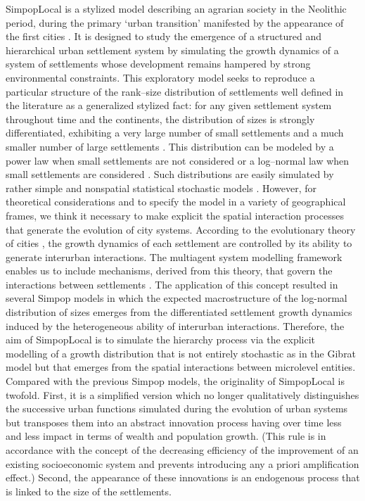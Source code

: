 SimpopLocal is a stylized model describing an agrarian society in the Neolithic period, during the primary ‘urban transition’ manifested by the appearance of the first cities \autocite{Schmitt2014}. It is designed to study the emergence of a structured and hierarchical urban settlement system by simulating the growth dynamics of a system of settlements whose development remains hampered by strong environmental constraints. This exploratory model seeks to reproduce a particular structure of the rank–size distribution of settlements well defined in the literature as a generalized stylized fact: for any given settlement system throughout time and the continents, the distribution of sizes is strongly differentiated, exhibiting a very large number of small settlements and a much smaller number of large settlements \autocites{Archaeomedes1998,Berry1964a,Fletcher1986,Liu1996}. This distribution can be modeled by a power law when small settlements are not considered or a log–normal law when small settlements are considered \autocites{Favaro2011, Robston1973}. Such distributions are easily simulated by rather simple and nonspatial statistical stochastic models \autocites{Gibrat1931,Simon1955}. However, for theoretical considerations and to specify the model in a variety of geographical frames, we think it necessary to make explicit the spatial interaction processes that generate the evolution of city systems. According to the evolutionary theory of cities \autocite{Pumain2009}, the growth dynamics of each settlement are controlled by its ability to generate interurban inter­actions. The multiagent system modelling framework enables us to include mechanisms, derived from this theory, that govern the interactions between settlements \autocites{Bretagnolle2006, Sanders2013}. The application of this concept resulted in several Simpop models \autocites{Bretagnolle2010, Bura1996,Pumain2009, Sanders1997} in which the expected macrostructure of the log-normal distribution of sizes emerges from the differentiated settlement growth dynamics induced by the heterogeneous ability of interurban interactions. Therefore, the aim of SimpopLocal is to simulate the hierarchy process via the explicit modelling of a growth distribution that is not entirely stochastic as in the Gibrat model \autocite{Gibrat1931} but that emerges from the spatial interactions between microlevel entities. Compared with the previous Simpop models, the originality of SimpopLocal is twofold. First, it is a simplified version which no longer qualitatively distinguishes the successive urban functions simulated during the evolution of urban systems but transposes them into an abstract innovation process having over time less and less impact in terms of wealth and population growth. (This rule is in accordance with the concept of the decreasing efficiency of the improvement of an existing socioeconomic system and prevents introducing any a priori amplification effect.) Second, the appearance of these innovations is an endogenous process that is linked to the size of the settlements.


